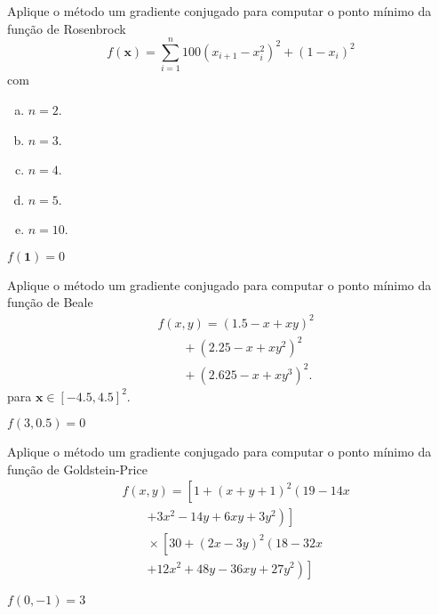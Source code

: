 \begin{exer}
  Aplique o método um gradiente conjugado para computar o ponto mínimo da função de Rosenbrock{\rosenbrock}
  \begin{equation}
    f(\pmb{x}) = \sum_{i=1}^n 100\left(x_{i+1}-x_i^2\right)^2 + (1-x_i)^2
  \end{equation}
  com
  \begin{enumerate}[a)]
    \item $n = 2$.
    \item $n = 3$.
    \item $n = 4$.
    \item $n = 5$.
    \item $n = 10$.
  \end{enumerate}
\end{exer}
\begin{resp}
$f(\pmb{1}) = 0$
\end{resp}

\begin{exer}
  Aplique o método um gradiente conjugado para computar o ponto mínimo da função de Beale \cite{Beale1955a}
  \begin{equation}
    \begin{aligned}
      & f(x,y) = (1.5-x+xy)^2 \\
      &\qquad + (2.25-x+xy^2)^2 \\
      &\qquad + (2.625-x+xy^3)^2.
    \end{aligned}
  \end{equation}
  para $\pmb{x}\in [-4.5, 4.5]^2$.
\end{exer}
\begin{resp}
  $f(3, 0.5) = 0$
\end{resp}

\begin{exer}
  Aplique o método um gradiente conjugado para computar o ponto mínimo da função de Goldstein-Price \cite{Goldstein1971a}
  \begin{equation}
    \begin{aligned}
      & f(x,y) = \left[1+\left(x+y+1\right)^{2}\left(19-14x \right.\right.\\
      &\qquad \left.\left.+ 3x^{2}-14y+6xy+3y^{2}\right)\right] \\
      &\qquad \times \left[30+\left(2x-3y\right)^{2}\left(18-32x\right.\right.\\
      &\qquad \left.\left.+12x^{2}+48y-36xy+27y^{2}\right)\right]
    \end{aligned}  
  \end{equation}
\end{exer}
\begin{resp}
  $f(0,-1) = 3$
\end{resp}

